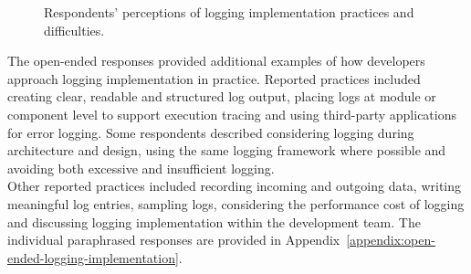 \begin{figure}[H]
{
    }
    \caption{Respondents' perceptions of logging implementation
    practices and difficulties.}
    \label{fig:results-logging-difficulties}
\end{figure}



The open-ended responses provided additional examples of how developers approach
logging implementation in practice. Reported practices included creating clear,
readable and structured log output, placing logs at module or component level to
support execution tracing and using third-party applications for error logging.
Some respondents described considering logging during architecture and design,
using the same logging framework where possible and avoiding both excessive and
insufficient logging.
\\
Other reported practices included recording incoming and outgoing data, writing
meaningful log entries, sampling logs, considering the performance cost of logging
and discussing logging implementation within the development team. The individual
paraphrased responses are provided in
Appendix~\ref{appendix:open-ended-logging-implementation}.

